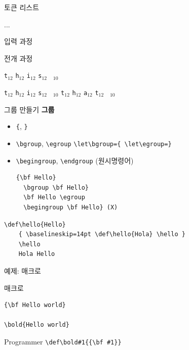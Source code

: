 \documentclass{beamer}
\begin{document}
%
\begin{frame}[fragile]{토큰 리스트}
  \begin{Verbatim*}
\def\tokentwo{\iftrue this \else that \fi}
\def\tokenone#1{...}
...
\expandafter\tokenone\tokentwo
  \end{Verbatim*}
  \bigskip

  \alert{입력 과정}
  
  \quad
  \quad
  
  \bigskip
  \alert{전개 과정}
  
  \quad
  \verb|t|$_{12}$\quad
  \verb|h|$_{12}$\quad
  \verb|i|$_{12}$\quad
  \verb|s|$_{12}$\quad
  \verb*| |$_{10}$
  
  \bigskip
  \quad
  \quad
  \verb|t|$_{12}$\quad
  \verb|h|$_{12}$\quad
  \verb|i|$_{12}$\quad
  \verb|s|$_{12}$\quad
  \verb*| |$_{10}$\quad
  \quad
  \verb|t|$_{12}$\quad
  \verb|h|$_{12}$\quad
  \verb|a|$_{12}$\quad
  \verb|t|$_{12}$\quad
  \verb*| |$_{10}$\quad
\end{frame}


%
\begin{frame}[fragile]{그룹 만들기}
  \textbf{\alert{그룹}}
  \begin{itemize}
  \item \verb+{+, \verb+}+
  \item \verb+\bgroup+, \verb+\egroup+
    {\color{blue}\small \verb+\let\bgroup={ \let\egroup=}+}
  \item \verb+\begingroup+, \verb+\endgroup+ (원시명령어)
    \medskip
    \begin{Verbatim}[fontsize=\small]
  {\bf Hello}
  \bgroup \bf Hello}
  \bf Hello \egroup
  \begingroup \bf Hello} (X)
    \end{Verbatim}
  \end{itemize}
  \begin{Verbatim}[fontsize=\small, formatcom=\color{blue}]
    \def\hello{Hello}
    { \baselineskip=14pt \def\hello{Hola} \hello }
    \hello
    Hola Hello
  \end{Verbatim}
\end{frame}


%
\begin{frame}[standout]
  예제: \texttt{\string\bold} 매크로
\end{frame}


%
\begin{frame}[fragile]{\texttt{\string\bold} 매크로}
  \begin{Verbatim}[formatcom=\color{blue}]
{\bf Hello world}
    
\bold{Hello world}
  \end{Verbatim}
  \begin{alertblock}{Programmer}
    \verb+\def\bold#1{{\bf #1}}+
  \end{alertblock}
\end{frame}
\end{document}
